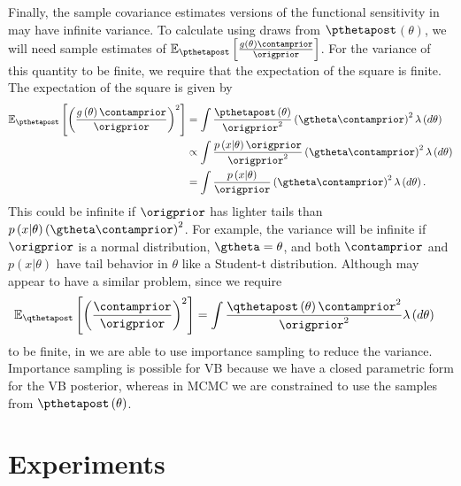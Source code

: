 \documentclass{article}\usepackage[]{graphicx}\usepackage[]{color}
\theoremstyle{plain}
\theoremstyle{definition}
\theoremstyle{plain}
\theoremstyle{plain}
\theoremstyle{plain}
\theoremstyle{plain}
\begin{document}
Finally, the sample covariance estimates versions of the functional
sensitivity in  may have infinite
variance. To calculate  using
draws from $\pthetapost$$\left(\theta\right)$, we will need sample
estimates of $\mbep\left[\frac{g\left(\theta\right)\contamprior}{\origprior}\right]$.
For the variance of this quantity to be finite, we require that the
expectation of the square is finite. The expectation of the square
is given by
\begin{align*}
\mbep\left[\left(\frac{g\left(\theta\right)\contamprior}{\origprior}\right)^{2}\right] & =\int\frac{\pthetapost\left(\theta\right)}{\origprior^{2}}\left(\gtheta\contamprior\right)^{2}\lambda\left(d\theta\right)\\
 & \propto\int\frac{p\left(x\vert\theta\right)\origprior}{\origprior^{2}}\left(\gtheta\contamprior\right)^{2}\lambda\left(d\theta\right)\\
 & =\int\frac{p\left(x\vert\theta\right)}{\origprior}\left(\gtheta\contamprior\right)^{2}\lambda\left(d\theta\right).
\end{align*}
This could be infinite if $\origprior$ has lighter tails than $p\left(x\vert\theta\right)\left(\gtheta\contamprior\right)^{2}$.
For example, the variance will be infinite if $\origprior$ is a normal
distribution, $\gtheta=\theta$, and both $\contamprior$ and $p\left(x\vert\theta\right)$
have tail behavior in $\theta$ like a Student-t distribution. Although
 may appear to have a similar
problem, since we require
\begin{align*}
\mbe_{\qthetapost}\left[\left(\frac{\contamprior}{\origprior}\right)^{2}\right] & =\int\frac{\qthetapost\left(\theta\right)\contamprior^{2}}{\origprior^{2}}\lambda\left(d\theta\right)
\end{align*}
to be finite, in  we are able
to use importance sampling to reduce the variance. Importance sampling
is possible for VB because we have a closed parametric form for the
VB posterior, whereas in MCMC we are constrained to use the samples
from $\pthetapost\left(\theta\right)$.

\section{Experiments\label{sec:experiments} }
\end{document}
